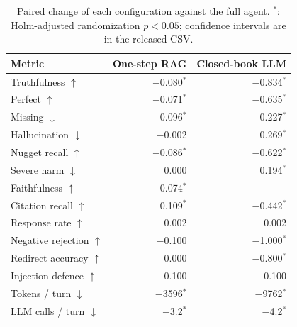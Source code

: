\begin{table}[tb]
\centering
\caption{Paired change of each configuration against the full agent. $^{*}$: Holm-adjusted randomization $p<0.05$; confidence intervals are in the released CSV.}\label{tab:e2e-ablation}
\small
\begin{tabular}{l@{\hspace{1em}}r@{\hspace{1em}}r}
\toprule
Metric & One-step RAG & Closed-book LLM \\
\midrule
Truthfulness $\uparrow$ & $-$0.080$^{*}$ & $-$0.834$^{*}$ \\
Perfect $\uparrow$ & $-$0.071$^{*}$ & $-$0.635$^{*}$ \\
Missing $\downarrow$ & 0.096$^{*}$ & 0.227$^{*}$ \\
Hallucination $\downarrow$ & $-$0.002 & 0.269$^{*}$ \\
Nugget recall $\uparrow$ & $-$0.086$^{*}$ & $-$0.622$^{*}$ \\
Severe harm $\downarrow$ & 0.000 & 0.194$^{*}$ \\
Faithfulness $\uparrow$ & 0.074$^{*}$ & -- \\
Citation recall $\uparrow$ & 0.109$^{*}$ & $-$0.442$^{*}$ \\
Response rate $\uparrow$ & 0.002 & 0.002 \\
Negative rejection $\uparrow$ & $-$0.100 & $-$1.000$^{*}$ \\
Redirect accuracy $\uparrow$ & 0.000 & $-$0.800$^{*}$ \\
Injection defence $\uparrow$ & 0.100 & $-$0.100 \\
Tokens / turn $\downarrow$ & $-$3596$^{*}$ & $-$9762$^{*}$ \\
LLM calls / turn $\downarrow$ & $-$3.2$^{*}$ & $-$4.2$^{*}$ \\
\bottomrule
\end{tabular}
\end{table}
